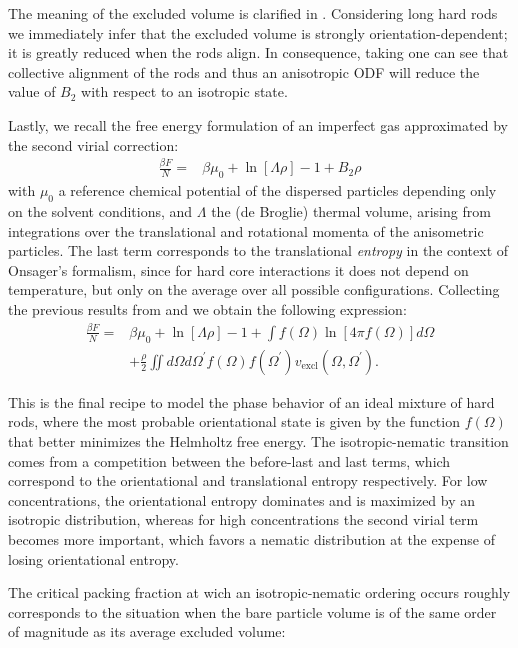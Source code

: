 The meaning of the excluded volume is clarified in . Considering long hard rods we immediately infer that the excluded volume is strongly orientation-dependent; it is greatly reduced when the rods align. In consequence, taking  one can see that collective alignment of the rods and thus an anisotropic ODF will reduce the value of $B_2$ with respect to an isotropic state.

Lastly, we recall the free energy formulation of an imperfect gas approximated by the second virial correction:
\begin{align}
\frac{\beta F}{N} =& \beta \mu_{0}+\ln\left[\Lambda\rho\right]-1+ B_2 \rho
\end{align}
with $\mu_{0}$ a reference chemical potential of the dispersed particles depending only on the solvent conditions, and $\Lambda$ the (de Broglie) thermal volume, arising from
integrations over the translational and rotational momenta of the anisometric particles. The last term corresponds to the translational {\em entropy} in the context of Onsager's formalism, since for hard core interactions it does not depend on temperature, but only on the average over all possible configurations. Collecting the previous results from  and  we obtain the following expression:
\begin{align}
\frac{\beta F}{N} =& \beta \mu_{0}+\ln\left[\Lambda\rho\right]-1+
\int f(\Omega)\ln \left[4\pi f(\Omega)\right]d\Omega \nonumber \\
&+\frac{\rho}{2} \iint d\Omega d\Omega^{\prime}
f(\Omega)f(\Omega^{\prime})v_{\text{excl}}(\Omega,\Omega^{\prime}). \label{0freetot}
\end{align}

This is the final recipe to model the phase behavior of an ideal mixture of hard rods, where the most probable orientational state is given by the function $f(\Omega)$ that better minimizes the Helmholtz free energy. The isotropic-nematic transition comes from a competition between the before-last and last terms, which correspond to the orientational and translational entropy respectively. For low concentrations, the orientational entropy dominates and is maximized by an isotropic distribution, whereas for high concentrations the second virial term becomes more important, which favors a nematic distribution at the expense of losing orientational entropy.

The critical packing fraction at wich an isotropic-nematic ordering occurs roughly corresponds to the situation when the bare particle volume is of the same order of magnitude as its average excluded volume:

